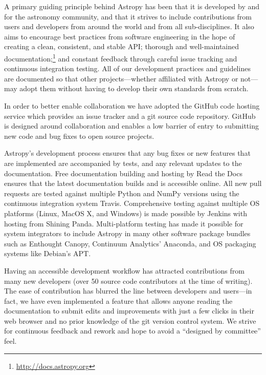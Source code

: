 \documentclass[11pt,twoside]{article}
\begin{document}
A primary guiding principle behind Astropy has been that it is developed by and
for the astronomy community, and that it strives to include contributions from
users and developers from around the world and from all sub-disciplines.  It
also aims to encourage best practices from software engineering in the hope of
creating a clean, consistent, and stable API; thorough and well-maintained
documentation;\footnote{\url{http://docs.astropy.org}} and constant feedback
through careful issue tracking and continuous integration testing.  All of our
development practices and guidelines are documented so that other
projects---whether affiliated with Astropy or not---may adopt them without
having to develop their own standards from scratch.

In order to better enable collaboration we have adopted the GitHub code hosting
service which provides an issue tracker and a git source code repository.
GitHub is designed around collaboration and enables a low barrier of entry to
submitting new code and bug fixes to open source projects.

Astropy's development process ensures that any bug fixes or new features that
are implemented are accompanied by tests, and any relevant updates to the
documentation.  Free documentation building and hosting by Read the Docs
ensures that the latest documentation builds and is accessible online.  All new
pull requests are tested against multiple Python and NumPy versions using the
continuous integration system Travis.  Comprehensive testing against multiple
OS platforms (Linux, MacOS X, and Windows) is made possible by Jenkins with
hosting from Shining Panda.  Multi-platform testing has made it possible for
system integrators to include Astropy in many other software package bundles
such as Enthought Canopy, Continuum Analytics' Anaconda, and OS packaging
systems like Debian's APT.

Having an accessible development workflow has attracted contributions from many
new developers (over 50 source code contributors at the time of writing).  The
ease of contribution has blurred the line between developers and users---in
fact, we have even implemented a feature that allows anyone reading the
documentation to submit edits and improvements with just a few clicks in their
web browser and no prior knowledge of the git version control system.  We
strive for continuous feedback and rework and hope to avoid a ``designed by
committee'' feel.


\end{document}
